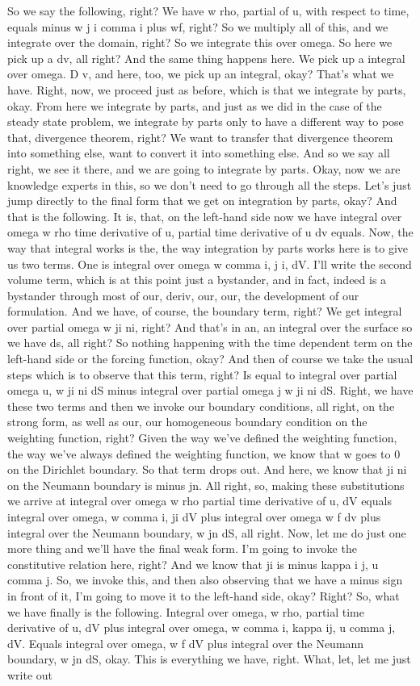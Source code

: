 \documentclass[10pt]{article}
\begin{document}
So we say the following, right? We have w rho, partial of u, with respect to time, equals minus w j i comma i plus wf, right? So we multiply all of this, and we integrate over the domain, right? So we integrate this over omega. So here we pick up a dv, all right? And the same thing happens here. We pick up a integral over omega. D v, and here, too, we pick up an integral, okay? That's what we have. Right, now, we proceed just as before, which is that we integrate by parts, okay. From here we integrate by parts, and just as we did in the case of the steady state problem, we integrate by parts only to have a different way to pose that, divergence theorem, right? We want to transfer that divergence theorem into something else, want to convert it into something else. And so we say all right, we see it there, and we are going to integrate by parts. Okay, now we are knowledge experts in this, so we don't need to go through all the steps. Let's just jump directly to the final form that we get on integration by parts, okay? And that is the following. It is, that, on the left-hand side now we have integral over omega w rho time derivative of u, partial time derivative of u dv equals. Now, the way that integral works is the, the way integration by parts works here is to give us two terms. One is integral over omega w comma i, j i, dV. I'll write the second volume term, which is at this point just a bystander, and in fact, indeed is a bystander through most of our, deriv, our, our, the development of our formulation. And we have, of course, the boundary term, right? We get integral over partial omega w ji ni, right? And that's in an, an integral over the surface so we have ds, all right? So nothing happening with the time dependent term on the left-hand side or the forcing function, okay? And then of course we take the usual steps which is to observe that this term, right? Is equal to integral over partial omega u, w ji ni dS minus integral over partial omega j w ji ni dS. Right, we have these two terms and then we invoke our boundary conditions, all right, on the strong form, as well as our, our homogeneous boundary condition on the weighting function, right? Given the way we've defined the weighting function, the way we've always defined the weighting function, we know that w goes to 0 on the Dirichlet boundary. So that term drops out. And here, we know that ji ni on the Neumann boundary is minus jn. All right, so, making these substitutions we arrive at integral over omega w rho partial time derivative of u, dV equals integral over omega, w comma i, ji dV plus integral over omega w f dv plus integral over the Neumann boundary, w jn dS, all right. Now, let me do just one more thing and we'll have the final weak form. I'm going to invoke the constitutive relation here, right? And we know that ji is minus kappa i j, u comma j. So, we invoke this, and then also observing that we have a minus sign in front of it, I'm going to move it to the left-hand side, okay? Right? So, what we have finally is the following. Integral over omega, w rho, partial time derivative of u, dV plus integral over omega, w comma i, kappa ij, u comma j, dV. Equals integral over omega, w f dV plus integral over the Neumann boundary, w jn dS, okay. This is everything we have, right. What, let, let me just write out 
\end{document}
